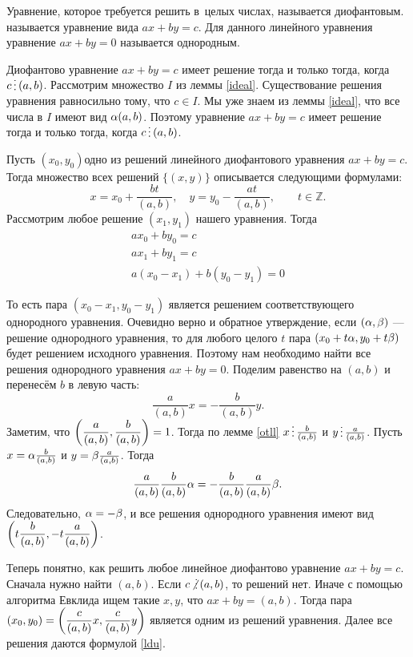 \documentclass[a4paper,12pt]{article}
\newcommand{\ndv}{\smash{\mskip3mu\not\lower1truept\hbox{\vdots}\mskip3mu}}
\begin{document}
Уравнение, которое требуется решить в~целых числах, называется  диофантовым.  называется уравнение вида $ax+by=c$. Для данного линейного уравнения уравнение $ax+by=0$ называется  однородным.

\label{df}
Диофантово уравнение $ax+by=c$ имеет решение тогда и только тогда, когда $c\dv (a,b)$.
Рассмотрим множество $I$ из леммы \ref{ideal}.
Существование решения уравнения равносильно тому, что $c\in I$.
Мы уже знаем из леммы \ref{ideal}, что все числа в $I$ имеют вид $\alpha(a,b)$.
Поэтому уравнение $ax+by=c$ имеет решение тогда и только тогда, когда $c\dv (a,b)$.

\label{dff}
Пусть $(x_{0}, y_{0})$\т одно из решений линейного диофантового уравнения $ax+by=c$. Тогда множество всех решений $\{(x,y)\}$ описывается следующими формулами:
\begin{equation}\label{ldu}
x=x_{0}+\dfrac{bt}{(a,b)},\quad y=y_{0}-\dfrac{at}{(a,b)},\qquad t\in\mathbb Z.
\end{equation}
Рассмотрим любое решение $(x_1,y_1)$ нашего уравнения.
Тогда
\begin{eqnarray*}
  ax_0 + by_0 = c \\
  ax_1 + by_1 = c \\
  a(x_0-x_1) + b (y_0-y_1) = 0 
\end{eqnarray*}

То есть пара $(x_{0}-x_{1}, y_{0}-y_{1})$ является решением соответствующего однородного уравнения.
Очевидно верно и обратное утверждение, если $(\alpha,\beta)$ --- решение однородного уравнения, то для любого целого $t$ пара $(x_0+t\alpha, y_0+t\beta)$ будет решением исходного уравнения. Поэтому нам необходимо найти все решения однородного уравнения $ax+by=0$.
Поделим равенство на $(a,b)$ и перенесём $b$ в левую часть:
$$
\dfrac{a}{(a,b)} x = -\dfrac{b}{(a,b)} y.
$$
Заметим, что $\left(\dfrac{a}{(a,b)}, \dfrac{b}{(a,b)}\right)=1$. Тогда по лемме \ref{otll} $x \dv \frac{b}{(a,b)}$ и $y\dv \frac{a}{(a,b)}$.
Пусть $x=\alpha\frac{b}{(a,b)}$ и $y=\beta\frac{a}{(a,b)}$. Тогда
$$
\dfrac{a}{(a,b)} \dfrac{b}{(a,b)}\alpha = -\dfrac{b}{(a,b)} \dfrac{a}{(a,b)} \beta.
$$
Следовательно, $\alpha=-\beta$, и все решения однородного уравнения имеют вид $\left(t\dfrac{b}{(a,b)}, -t\dfrac{a}{(a,b)}\right)$.

\bigskip
Теперь понятно, как решить любое линейное диофантово уравнение $ax+by=c$. Сначала нужно найти $(a,b)$. Если $c\ndv (a,b)$, то решений нет.
Иначе с помощью алгоритма Евклида ищем такие $x,y$, что $ax+by = (a,b)$.
Тогда пара $(x_0,y_0) = \left(\dfrac{c}{(a,b)} x, \dfrac{c}{(a,b)} y\right)$ является одним из решений уравнения.
Далее все решения даются формулой \ref{ldu}.
\end{document}
